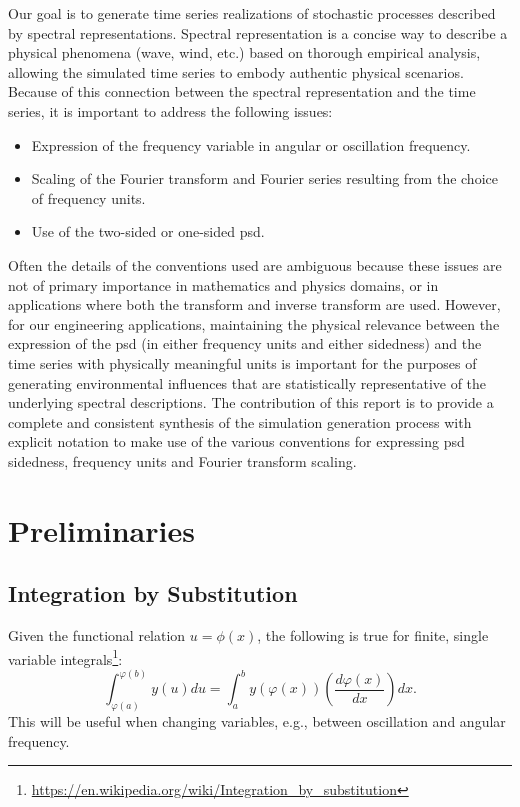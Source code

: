 \documentclass[journal]{IEEEtran}
\begin{document}
Our goal is to generate time series realizations of stochastic processes described by spectral representations.  Spectral representation is a concise way to describe a physical phenomena (wave, wind, etc.) based on thorough empirical analysis, allowing the simulated time series to embody authentic physical scenarios.  Because of this connection between the spectral representation and the time series, it is important to address the following issues:
\begin{itemize}
\item Expression of the frequency variable in angular or oscillation frequency.
\item Scaling of the Fourier transform and Fourier series resulting from the choice of frequency units.
\item Use of the two-sided or one-sided \ac{psd}.
\end{itemize}
Often the details of the conventions used are ambiguous because these issues are not of primary importance in mathematics and physics domains, or in applications where both the transform and inverse transform are used.  However, for our engineering applications, maintaining the physical relevance between the expression of the \ac{psd} (in either frequency units and either sidedness) and the time series with physically meaningful units is important for the purposes of generating environmental influences that are statistically representative of the underlying spectral descriptions.  The contribution of this report is to provide a complete and consistent synthesis of the simulation generation process with explicit notation to make use of the various conventions for expressing \ac{psd} sidedness, frequency units and Fourier transform scaling.


\section{Preliminaries}

\subsection{Integration by Substitution}

Given the functional relation $u=\phi(x)$, the following is true for finite, single variable integrals\footnote{\url{https://en.wikipedia.org/wiki/Integration_by_substitution}}:
\begin{equation}
  \int_{\varphi(a)}^{\varphi(b)} y(u) du = \int_a^b y(\varphi(x)) \left(\frac{d \varphi(x)}{dx}\right) dx.
  \label{e:ibs}
\end{equation}
This will be useful when changing variables, e.g., between oscillation and angular frequency.
\end{document}
